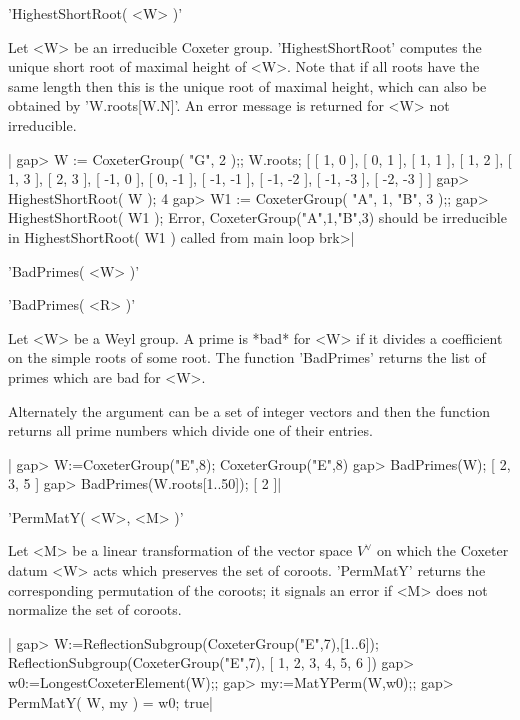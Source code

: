 
'HighestShortRoot( <W> )'

Let <W> be an irreducible Coxeter  group. 'HighestShortRoot' computes the
unique short root of maximal height of <W>.  Note that  if all roots have
the same length then this is the unique root of maximal height, which can
also be obtained by 'W.roots[W.N]'.  An error message is returned for <W>
not irreducible.

|    gap> W := CoxeterGroup( "G", 2 );;  W.roots;
    [ [ 1, 0 ], [ 0, 1 ], [ 1, 1 ], [ 1, 2 ], [ 1, 3 ], [ 2, 3 ],
      [ -1, 0 ], [ 0, -1 ], [ -1, -1 ], [ -1, -2 ], [ -1, -3 ],
      [ -2, -3 ] ]
    gap> HighestShortRoot( W );
    4
    gap> W1 := CoxeterGroup( "A", 1, "B", 3 );;
    gap> HighestShortRoot( W1 );
    Error, CoxeterGroup("A",1,"B",3) should be irreducible
     in
    HighestShortRoot( W1 ) called from
    main loop
    brk>|


'BadPrimes( <W> )'

'BadPrimes( <R> )'

Let  <W>  be  a  Weyl  group.  A  prime  is  *bad*  for <W> if it divides a
coefficient  on the  simple roots  of some  root. The  function 'BadPrimes'
returns the list of primes which are bad for <W>.

Alternately  the argument  can be  a set  of integer  vectors and  then the
function returns all prime numbers which divide one of their entries.

|    gap> W:=CoxeterGroup("E",8);
    CoxeterGroup("E",8)
    gap> BadPrimes(W);
    [ 2, 3, 5 ]
    gap> BadPrimes(W.roots{[1..50]});
    [ 2 ]|


'PermMatY( <W>, <M> )'

Let <M> be a linear transformation of  the vector space $V^\vee$ on which
the Coxeter    datum  <W> acts  which  preserves    the  set of  coroots.
'PermMatY'  returns  the  corresponding permutation of    the coroots; it
signals an error if <M> does not normalize the set of coroots.

|    gap>  W:=ReflectionSubgroup(CoxeterGroup("E",7),[1..6]);
    ReflectionSubgroup(CoxeterGroup("E",7), [ 1, 2, 3, 4, 5, 6 ])
    gap>  w0:=LongestCoxeterElement(W);;
    gap> my:=MatYPerm(W,w0);;
    gap> PermMatY( W, my ) = w0;
    true|

